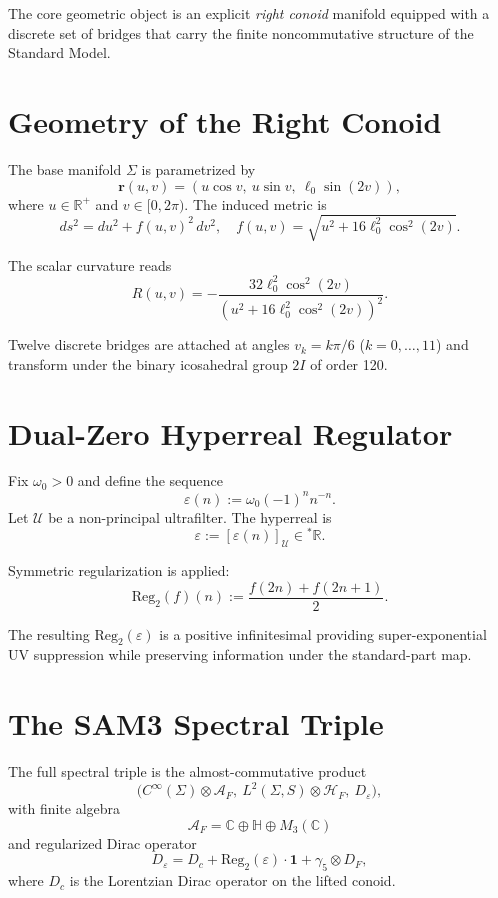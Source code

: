 \documentclass[11pt,a4paper]{article}
\begin{document}
The core geometric object is an explicit \emph{right conoid} manifold equipped with a discrete set of bridges that carry the finite noncommutative structure of the Standard Model.

\section{Geometry of the Right Conoid}

The base manifold \(\Sigma\) is parametrized by
\[
\mathbf{r}(u,v) = (u \cos v,\ u \sin v,\ \ell_0 \sin(2v)),
\]
where \(u \in \mathbb{R}^+\) and \(v \in [0, 2\pi)\). The induced metric is
\[
ds^2 = du^2 + f(u,v)^2 \, dv^2, \quad f(u,v) = \sqrt{u^2 + 16\ell_0^2 \cos^2(2v)}.
\]

The scalar curvature reads
\[
R(u,v) = -\frac{32 \ell_0^2 \cos^2(2v)}{(u^2 + 16\ell_0^2 \cos^2(2v))^2}.
\]

Twelve discrete bridges are attached at angles \(v_k = k\pi/6\) (\(k=0,\dots,11\)) and transform under the binary icosahedral group \(2I\) of order 120.

\section{Dual-Zero Hyperreal Regulator}

Fix \(\omega_0 > 0\) and define the sequence
\[
\varepsilon(n) := \omega_0 (-1)^n n^{-n}.
\]
Let \(\mathcal{U}\) be a non-principal ultrafilter. The hyperreal is
\[
\varepsilon := [\varepsilon(n)]_{\mathcal{U}} \in {}^*\mathbb{R}.
\]

Symmetric regularization is applied:
\[
\mathrm{Reg}_2(f)(n) := \frac{f(2n) + f(2n+1)}{2}.
\]

The resulting \(\mathrm{Reg}_2(\varepsilon)\) is a positive infinitesimal providing super-exponential UV suppression while preserving information under the standard-part map.

\section{The SAM3 Spectral Triple}

The full spectral triple is the almost-commutative product
\[
\bigl( C^\infty(\Sigma) \otimes \mathcal{A}_F,\ 
L^2(\Sigma,S) \otimes \mathcal{H}_F,\ 
D_\varepsilon \bigr),
\]
with finite algebra
\[
\mathcal{A}_F = \mathbb{C} \oplus \mathbb{H} \oplus M_3(\mathbb{C})
\]
and regularized Dirac operator
\[
D_\varepsilon = D_c + \mathrm{Reg}_2(\varepsilon) \cdot \mathbf{1} + \gamma_5 \otimes D_F,
\]
where \(D_c\) is the Lorentzian Dirac operator on the lifted conoid.
\end{document}
